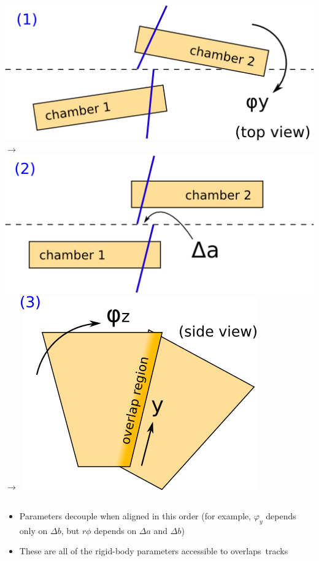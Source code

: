 \documentclass[compress]{beamer}
\begin{document}
\begin{frame}
\begin{columns}
\includegraphics[width=\linewidth]{topview_1.png}
\hfill $\to$ \hfill
{}
\includegraphics[width=\linewidth]{topview_2.png}
\hfill $\to$ \hfill
{}
\includegraphics[width=\linewidth]{sideview.png}
\end{columns}

\vfill
\begin{itemize}
\item Parameters decouple when aligned in this order (for example,
  $\varphi_y$ depends only on $\Delta b$, but $r\phi$ depends on
  $\Delta a$ and $\Delta b$)
\item These are all of the rigid-body parameters accessible to \mbox{overlaps tracks\hspace{-1 cm}}
\end{itemize}
\end{frame}
\end{document}
